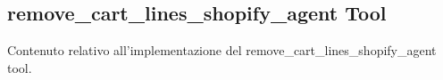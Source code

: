 \subsection{remove\_cart\_lines\_shopify\_agent Tool}

Contenuto relativo all'implementazione del remove\_cart\_lines\_shopify\_agent tool.
